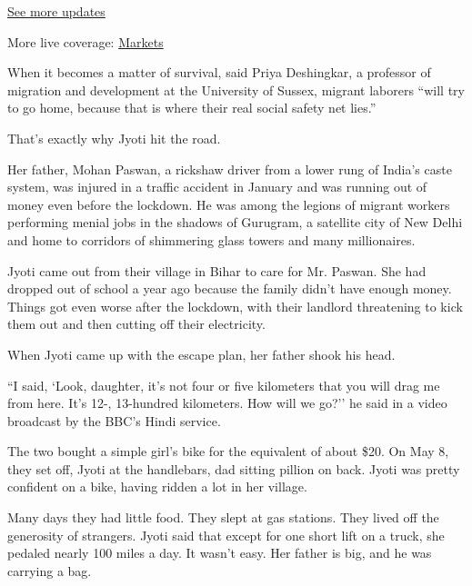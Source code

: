 \href{https://www.nytimes.com/2020/08/01/world/coronavirus-covid-19.html?action=click\&pgtype=Article\&state=default\&region=MAIN_CONTENT_1\&context=storylines_live_updates}{See
more updates}

More live coverage:
\href{https://www.nytimes.com/live/2020/07/31/business/stock-market-today-coronavirus?action=click\&pgtype=Article\&state=default\&region=MAIN_CONTENT_1\&context=storylines_live_updates}{Markets}

When it becomes a matter of survival, said Priya Deshingkar, a professor
of migration and development at the University of Sussex, migrant
laborers ``will try to go home, because that is where their real social
safety net lies.''

That's exactly why Jyoti hit the road.

Her father, Mohan Paswan, a rickshaw driver from a lower rung of India's
caste system, was injured in a traffic accident in January and was
running out of money even before the lockdown. He was among the legions
of migrant workers performing menial jobs in the shadows of Gurugram, a
satellite city of New Delhi and home to corridors of shimmering glass
towers and many millionaires.

Jyoti came out from their village in Bihar to care for Mr. Paswan. She
had dropped out of school a year ago because the family didn't have
enough money. Things got even worse after the lockdown, with their
landlord threatening to kick them out and then cutting off their
electricity.

When Jyoti came up with the escape plan, her father shook his head.

``I said, `Look, daughter, it's not four or five kilometers that you
will drag me from here. It's 12-, 13-hundred kilometers. How will we
go?'' he said in a video broadcast by the BBC's Hindi service.

The two bought a simple girl's bike for the equivalent of about \$20. On
May 8, they set off, Jyoti at the handlebars, dad sitting pillion on
back. Jyoti was pretty confident on a bike, having ridden a lot in her
village.

Many days they had little food. They slept at gas stations. They lived
off the generosity of strangers. Jyoti said that except for one short
lift on a truck, she pedaled nearly 100 miles a day. It wasn't easy. Her
father is big, and he was carrying a bag.

\href{https://www.nytimes.com/news-event/coronavirus?action=click\&pgtype=Article\&state=default\&region=MAIN_CONTENT_3\&context=storylines_faq}{}

